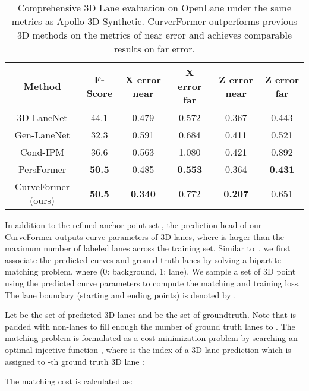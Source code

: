 \documentclass[letterpaper, 10 pt, conference]{ieeeconf}
\begin{document}
\begin{table}[t]
  \begin{center}
    \caption{Comprehensive 3D Lane evaluation on OpenLane under the same metrics as Apollo 3D Synthetic. CurverFormer outperforms previous 3D methods on the metrics of near error and achieves comparable results on far error.}
    \label{tab:results-openlane-val-set}
    \begin{tiny} 
    \begin{tabular}{cccccc}
    \toprule
      Method & F-Score & X error near & X error far & Z error near & Z error far \\
      \midrule
      3D-LaneNet\cite{garnett20193d} & 44.1 & 0.479 & 0.572 & 0.367 & 0.443 \\
      Gen-LaneNet\cite{guo2020gen} & 32.3 & 0.591 & 0.684 & 0.411 & 0.521 \\
      Cond-IPM & 36.6 & 0.563 & 1.080 & 0.421 & 0.892 \\
      PersFormer\cite{chen2022persformer} & \textbf{50.5} & 0.485 &  \textbf{0.553} & 0.364 &  \textbf{0.431} \\
      CurveFormer (ours) & \textbf{50.5} & \textbf{0.340} & 0.772 &  \textbf{0.207} & 0.651 \\
      \bottomrule
    \end{tabular}
    \end{tiny} 
  \end{center}
\end{table}


In addition to the refined anchor point set , the prediction head of our CurveFormer outputs curve parameters of  3D lanes, where  is larger than the maximum number of labeled lanes across the training set. 
Similar to~\cite{liu2022learning}, we first associate the predicted curves  and ground truth lanes  by solving a bipartite matching problem, where  (0: background, 1: lane). We sample a set of 3D point  using the predicted curve parameters to compute the matching and training loss. The lane boundary (starting and ending points) is denoted by .

Let  be the set of predicted 3D lanes and  be the set of groundtruth.
Note that  is padded with non-lanes to fill enough the number of ground truth lanes to . The matching problem is formulated as a cost minimization problem by searching an optimal injective function , where  is the index of a 3D lane prediction  which is assigned to -th ground truth 3D lane :

The matching cost is calculated as:
\end{document}

